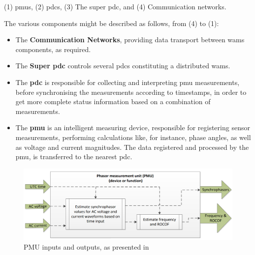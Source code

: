 (1) \acrshort{pmu}s, (2) \acrshort{pdc}s, (3) The super \acrshort{pdc}, and (4) Communication networks.

The various components might be described as follows, from (4) to (1):
\begin{itemize}
    \item The \textbf{Communication Networks}, providing data transport between \acrshort{wams} components, as required.
    \item The \textbf{Super \acrshort{pdc}} controls several \acrshort{pdc}s constituting a distributed \acrshort{wams}.
\item The \textbf{\acrfull{pdc}} is responsible for collecting and interpreting \acrshort{pmu} measurements, before synchronising the measurements according to timestamps, in order to get more complete status information based on a combination of measurements.
    \item The \textbf{\acrfull{pmu}} is an intelligent measuring device, responsible for registering sensor measurements,  performing calculations like, for instance, phase angles, as well as voltage and current magnitudes. The data registered and processed by the \acrshort{pmu}, is transferred to the nearest \acrshort{pdc}.
    \end{itemize}

\begin{figure}%
\includegraphics[width=\linewidth]{figures/PMU-in-out.png}
\caption[PMU inputs and outputs]{PMU inputs and outputs, as presented in \Cite[p.12]{iec2018measuring}
}
\label{fig:PMU-in-out}
\end{figure}

